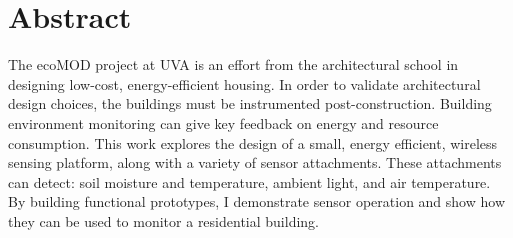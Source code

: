 \chapter{Abstract}

The ecoMOD project at UVA is an effort from the architectural school in designing low-cost, energy-efficient housing. In order to validate architectural design choices, the buildings must be instrumented post-construction. Building environment monitoring can give key feedback on energy and resource consumption. This work explores the design of a small, energy efficient, wireless sensing platform, along with a variety of sensor attachments. These attachments can detect: soil moisture and temperature, ambient light, and air temperature. By building functional prototypes, I demonstrate sensor operation and show how they can be used to monitor a residential building.